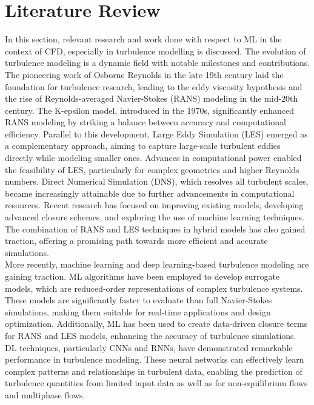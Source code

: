 \section{Literature Review}
In this section, relevant research and work done with respect to ML in the context of CFD, especially in turbulence modelling is discussed. The evolution of turbulence modeling is a dynamic field with notable milestones and contributions. The pioneering work of Osborne Reynolds in the late 19th century laid the foundation for turbulence research, leading to the eddy viscosity hypothesis and the rise of Reynolds-averaged Navier-Stokes (RANS) modeling in the mid-20th century. The K-epsilon model, introduced in the 1970s, significantly enhanced RANS modeling by striking a balance between accuracy and computational efficiency. Parallel to this development, Large Eddy Simulation (LES) emerged as a complementary approach, aiming to capture large-scale turbulent eddies directly while modeling smaller ones. Advances in computational power enabled the feasibility of LES, particularly for complex geometries and higher Reynolds numbers. Direct Numerical Simulation (DNS), which resolves all turbulent scales, became increasingly attainable due to further advancements in computational resources. Recent research has focused on improving existing models, developing advanced closure schemes, and exploring the use of machine learning techniques. The combination of RANS and LES techniques in hybrid models has also gained traction, offering a promising path towards more efficient and accurate simulations. \\
More recently, machine learning and deep learning-based turbulence modeling are gaining traction. ML algorithms have been employed to develop surrogate models, which are reduced-order representations of complex turbulence systems. These models are significantly faster to evaluate than full Navier-Stokes simulations, making them suitable for real-time applications and design optimization. Additionally, ML has been used to create data-driven closure terms for RANS and LES models, enhancing the accuracy of turbulence simulations. DL techniques, particularly CNNs and RNNs, have demonstrated remarkable performance in turbulence modeling. These neural networks can effectively learn complex patterns and relationships in turbulent data, enabling the prediction of turbulence quantities from limited input data as well as for non-equilibrium flows and multiphase flows. \\
